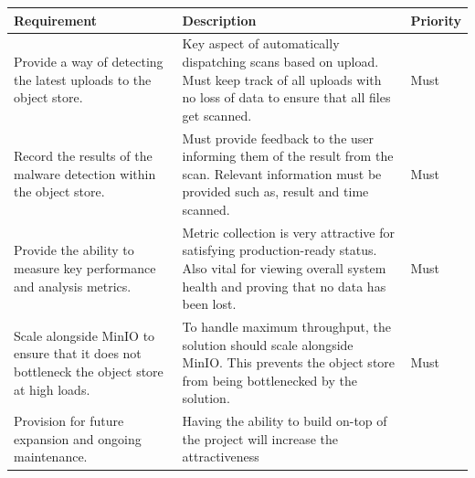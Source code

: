 \documentclass[12pt, conference, final, a4paper, onecolumn, compsoc]{IEEEtran}
\begin{document}
\begin{table}[H] \centering
  \begin{tabular}{|p{}|p{}|l|} \hline
    \textbf{Requirement} & \textbf{Description} & \textbf{Priority} \\ \hline
    Provide a way of detecting the latest uploads to the object store. & Key aspect
    of automatically dispatching scans based on upload. Must keep track of all
                                                                         uploads
                                                with no loss of data to ensure
                                                                         that
                                                                         all
                                                                         files
                                                                         get
                                                                         scanned.
                                                & Must \\ \hline Record the results of the malware
    detection within the object store. & Must provide feedback to the user
                                         informing them of the result from the
                                         scan. Relevant information must be
                                         provided such as, result and time scanned.  & Must \\ \hline Provide the ability to measure
    key performance and analysis metrics. & Metric
                      collection is very attractive for satisfying
                                            production-ready status. Also vital
                                            for viewing overall system health
                                            and proving that no data has been lost. & Must \\
    \hline Scale alongside MinIO to ensure that it does not bottleneck the
    object store at high loads. & To handle maximum throughput, the solution
                                 should scale alongside MinIO. This prevents the
                                                object store from being
                                  bottlenecked by the solution. & Must \\ \hline Provision
    for future expansion and ongoing maintenance. & Having the ability to build
                                                   on-top of the project will
                                                   increase the attractiveness

\end{tabular}
\end{table}
\end{document}
